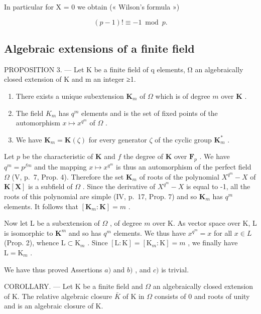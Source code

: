 In particular for X = 0 we obtain (« Wilson's formula »)

\[
(p - 1)! \equiv - 1 \bmod p.\tag{4}
\]

\subsection{Algebraic extensions of a finite field}

PROPOSITION 3. --- Let K be a finite field of q elements, Ω an algebraically closed extension of K and m an integer ≥1.

\begin{enumerate}
\def\labelenumi{\alph{enumi})}
\item
  There exists a unique subextension \(\mathbf{K}_m\) of \(\Omega\) which is of degree \(m\) over \(\mathbf{K}\) .
\item
  The field \(K_{m}\) has \(q^{m}\) elements and is the set of fixed points of the automorphism \(x \mapsto x^{q^{m}}\) of \(\Omega\) .
\item
  We have \(\mathbf{K}_m = \mathbf{K}(\zeta)\) for every generator \(\zeta\) of the cyclic group \(\mathbf{K}_m^*\) .
\end{enumerate}

Let \(p\) be the characteristic of \(\mathbf{K}\) and \(f\) the degree of \(\mathbf{K}\) over \(\mathbf{F}_p\) . We have \(q^m = p^{fm}\) and the mapping \(x \mapsto x^{q^m}\) is thus an automorphism of the perfect field \(\Omega\) (V, p.~7, Prop. 4). Therefore the set \(\mathbf{K}_m\) of roots of the polynomial \(X^{q^m} - X\) of \(\mathbf{K}[\mathbf{X}]\) is a subfield of \(\Omega\) . Since the derivative of \(X^{q^m} - X\) is equal to -1, all the roots of this polynomial are simple (IV, p.~17, Prop. 7) and so \(\mathbf{K}_m\) has \(q^m\) elements. It follows that \([\mathbf{K}_m : \mathbf{K}] = m\) .

Now let L be a subextension of \(\Omega\) , of degree \(m\) over K. As vector space over K, L is isomorphic to \(\mathbf{K}^m\) and so has \(q^m\) elements. We thus have \(x^{q^m} = x\) for all \(x \in L\) (Prop. 2), whence \(\mathrm{L} \subset \mathrm{K}_m\) . Since \([\mathrm{L} : \mathrm{K}] = [\mathrm{K}_m : \mathrm{K}] = m\) , we finally have \(\mathrm{L} = \mathrm{K}_m\) .

We have thus proved Assertions \(a)\) and \(b)\) , and \(c)\) is trivial.

COROLLARY. --- Let K be a finite field and \(\Omega\) an algebraically closed extension of K. The relative algebraic closure \(\bar{K}\) of K in \(\Omega\) consists of 0 and roots of unity and is an algebraic closure of K.

